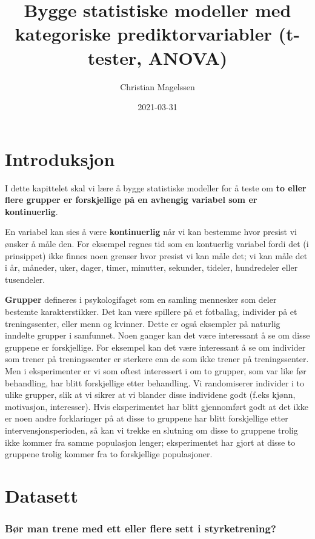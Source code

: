 \documentclass[
]{book}
\title{Bygge statistiske modeller med kategoriske prediktorvariabler (t-tester, ANOVA)}
\author{Christian Magelssen}
\date{2021-03-31}
\begin{document}
\maketitle

{
\setcounter{tocdepth}{1}
\tableofcontents
}
\hypertarget{intro}{%
\chapter{Introduksjon}\label{intro}}

I dette kapittelet skal vi lære å bygge statistiske modeller for å teste om \textbf{to eller flere grupper er forskjellige på en avhengig variabel som er kontinuerlig}.

En variabel kan sies å være \textbf{kontinuerlig} når vi kan bestemme hvor presist vi ønsker å måle den. For eksempel regnes tid som en kontuerlig variabel fordi det (i prinsippet) ikke finnes noen grenser hvor presist vi kan måle det; vi kan måle det i år, måneder, uker, dager, timer, minutter, sekunder, tideler, hundredeler eller tusendeler.

\textbf{Grupper} defineres i psykologifaget som en samling mennesker som deler bestemte karakterstikker. Det kan være spillere på et fotballag, individer på et treningssenter, eller menn og kvinner. Dette er også eksempler på naturlig inndelte grupper i samfunnet. Noen ganger kan det være interessant å se om disse gruppene er forskjellige. For eksempel kan det være interessant å se om individer som trener på treningssenter er sterkere enn de som ikke trener på treningssenter. Men i eksperimenter er vi som oftest interessert i om to grupper, som var like før behandling, har blitt forskjellige etter behandling. Vi randomiserer individer i to ulike grupper, slik at vi sikrer at vi blander disse individene godt (f.eks kjønn, motivasjon, interesser). Hvis eksperimentet har blitt gjennomført godt at det ikke er noen andre forklaringer på at disse to gruppene har blitt forskjellige etter intervensjonsperioden, så kan vi trekke en slutning om disse to gruppene trolig ikke kommer fra samme populasjon lenger; eksperimentet har gjort at disse to gruppene trolig kommer fra to forskjellige populasjoner.

\hypertarget{datasett}{%
\chapter{Datasett}\label{datasett}}

\hypertarget{buxf8r-man-trene-med-ett-eller-flere-sett-i-styrketrening}{%
\subsection{Bør man trene med ett eller flere sett i styrketrening?}\label{buxf8r-man-trene-med-ett-eller-flere-sett-i-styrketrening}}
\end{document}
